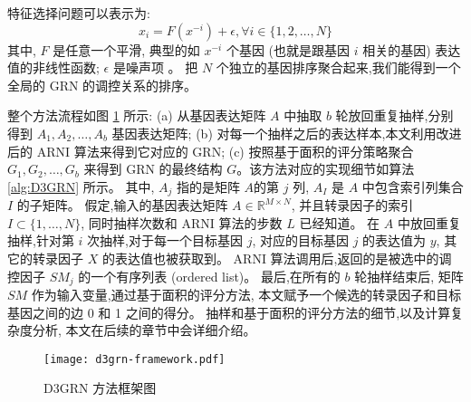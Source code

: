 特征选择问题可以表示为:
\begin{equation}
\label{eq:fs}
x_i =  F(x^{-i}) + \epsilon , \forall i \in \{1,2,\ldots,N\}
\end{equation}
其中, $F$ 是任意一个平滑, 典型的如 $x^{-i}$ 个基因 (也就是跟基因 $i$ 相关的基因) 表达值的非线性函数; $\epsilon$ 是噪声项 。
把 $N$ 个独立的基因排序聚合起来,我们能得到一个全局的 GRN 的调控关系的排序。


整个方法流程如图 \ref{d3grn} 所示: (a) 从基因表达矩阵 $A$ 中抽取 $b$ 轮放回重复抽样,分别得到 $A_1,A_2,\ldots,A_{b}$ 基因表达矩阵;
(b) 对每一个抽样之后的表达样本,本文利用改进后的 ARNI 算法来得到它对应的 GRN;
(c) 按照基于面积的评分策略聚合 $G_1, G_2, \ldots, G_b$ 来得到 GRN 的最终结构 $G$。该方法对应的实现细节如算法 \ref{alg:D3GRN} 所示。
其中, $A_j$ 指的是矩阵 $A$的第 $j$ 列, $A_I$ 是 $A$ 中包含索引列集合 $I$ 的子矩阵。
假定,输入的基因表达矩阵 $A \in \mathbb{R}^{M \times N}$, 
并且转录因子的索引 $I \subset \{1,\ldots,N\}$, 
同时抽样次数和 ARNI 算法的步数 $L$ 已经知道。
在 $A$ 中放回重复抽样,针对第 $i$ 次抽样,对于每一个目标基因 $j$, 
对应的目标基因 $j$ 的表达值为 $y$, 
其它的转录因子 $X$ 的表达值也被获取到。
ARNI 算法调用后,返回的是被选中的调控因子 $SM_j$ 的一个有序列表 (ordered list)。
最后,在所有的 $b$ 轮抽样结束后,
矩阵 $SM$ 作为输入变量,通过基于面积的评分方法,
本文赋予一个候选的转录因子和目标基因之间的边 0 和 1 之间的得分。
抽样和基于面积的评分方法的细节,以及计算复杂度分析,
本文在后续的章节中会详细介绍。
 
\begin{figure}[!htbp]
  \centering
  \texttt{[image: d3grn-framework.pdf]}
  \caption{D3GRN 方法框架图
}
  \label{d3grn}
\end{figure}

